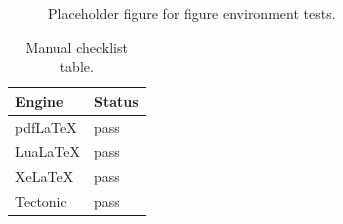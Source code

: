 \documentclass[11pt]{article}
\newif\ifbrokendiagnostics
\begin{document}
\begin{figure}[htbp]
  \centering
  \fbox{\rule{0pt}{40mm}\rule{0.8\linewidth}{0pt}}
  \caption{Placeholder figure for figure environment tests.}
  \label{fig:placeholder}
\end{figure}

\begin{table}[htbp]
  \centering
  \begin{tabular}{ll}
    \toprule
    Engine & Status \\
    \midrule
    pdfLaTeX & pass \\
    LuaLaTeX & pass \\
    XeLaTeX & pass \\
    Tectonic & pass \\
    \bottomrule
  \end{tabular}
  \caption{Manual checklist table.}
  \label{tab:engines}
\end{table}

\ifbrokendiagnostics
\thiscommanddoesnotexist
\fi



\end{document}
